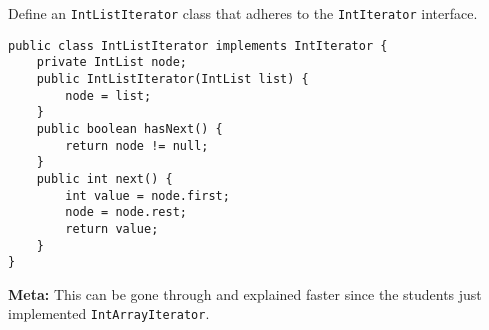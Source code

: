 \question Define an \lstinline$IntListIterator$ class that adheres to the
\lstinline$IntIterator$ interface.

\begin{solution}[3in]
\begin{lstlisting}
public class IntListIterator implements IntIterator {
    private IntList node;
    public IntListIterator(IntList list) {
        node = list;
    }
    public boolean hasNext() {
        return node != null;
    }
    public int next() {
        int value = node.first;
        node = node.rest;
        return value;
    }
}
\end{lstlisting}

\textbf{Meta:} This can be gone through and explained faster since the students
just implemented \lstinline$IntArrayIterator$.
\end{solution}
